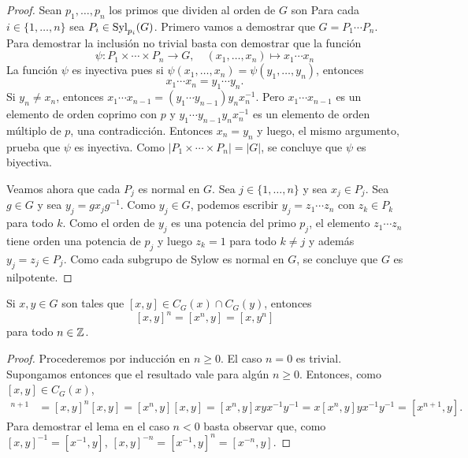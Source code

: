 \begin{proof}
	Sean $p_1,\dots,p_n$ los primos que dividen al orden de $G$ son Para cada
	$i\in\{1,\dots,n\}$ sea $P_i\in\mathrm{Syl}_{p_i}(G)$.  Primero vamos a demostrar
	que $G=P_1\cdots P_n$. Para demostrar la inclusión no trivial basta con
	demostrar que la función 
	\[
		\psi\colon P_1\times\cdots\times P_n\to G,\quad
		(x_1,\dots,x_n)\mapsto x_1\cdots x_n
	\]
	La función $\psi$ es inyectiva pues si
	$\psi(x_1,\dots,x_n)=\psi(y_1,\dots,y_n)$, entonces 
	\[
		x_1\cdots
	x_n=y_1\cdots y_n. 
	\]
	Si $y_n\ne x_n$, entonces $x_1\cdots x_{n-1}=(y_1\cdots
	y_{n-1})y_nx_n^{-1}$. Pero $x_1\cdots x_{n-1}$ es un elemento de orden
	coprimo con $p$ y $y_1\cdots y_{n-1}y_nx_n^{-1}$ es un elemento de orden
	múltiplo de $p$, una contradicción. Entonces $x_n=y_n$ y luego, el mismo
	argumento, prueba que $\psi$ es inyectiva. Como $|P_1\times\cdots\times
	P_n|=|G|$, se concluye que $\psi$ es biyectiva. 

	Veamos ahora que cada $P_j$ es normal en $G$.  Sea $j\in\{1,\dots,n\}$ y
	sea $x_j\in P_j$. Sea $g\in G$ y sea $y_j=gx_jg^{-1}$.  Como $y_j\in G$,
	podemos escribir $y_j=z_1\cdots z_n$ con $z_k\in P_k$ para todo $k$.  Como
	el orden de $y_j$ es una potencia del primo $p_j$, el elemento $z_1\cdots
	z_n$ tiene orden una potencia de $p_j$ y luego $z_k=1$ para todo $k\ne j$ y
	además $y_j=z_j\in P_j$. Como cada subgrupo de Sylow es normal en $G$, se
	concluye que $G$ es nilpotente.
\end{proof}



\begin{lemma}
	\label{lemma:commutador}
	Si $x,y\in G$ son tales que $[x,y]\in C_G(x)\cap C_G(y)$, entonces
	\[
	[x,y]^n=[x^n,y]=[x,y^n]
	\]
	para todo $n\in\mathbb{Z}$.
\end{lemma}

\begin{proof}
	Procederemos por inducción en $n\geq0$. El caso $n=0$ es trivial. Supongamos entonces
	que el resultado vale para algún $n\geq0$. Entonces, como $[x,y]\in C_G(x)$, 
	\begin{align*}
		[x,y]^{n+1}&=[x,y]^n[x,y]
		=[x^n,y][x,y]=[x^n,y]xyx^{-1}y^{-1}=x[x^n,y]yx^{-1}y^{-1}=[x^{n+1},y].
	\end{align*}
	Para demostrar el lema en el caso $n<0$ basta observar que, como $[x,y]^{-1}=[x^{-1},y]$, 
	$[x,y]^{-n}=[x^{-1},y]^n=[x^{-n},y]$.
\end{proof}

